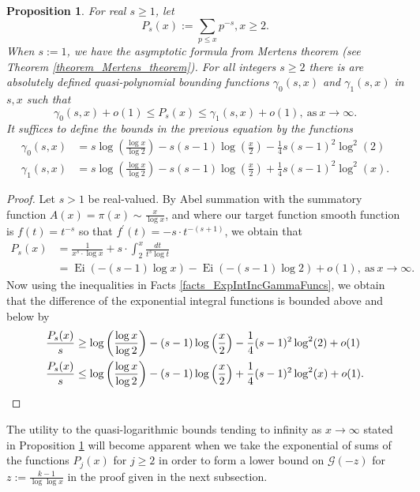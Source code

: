 \documentclass[11pt,reqno,a4letter]{article}
\numberwithin{figure}{section}
\numberwithin{table}{section}
\theoremstyle{plain}
\newtheorem{prop}[theorem]{Proposition}
\numberwithin{theorem}{section}
\theoremstyle{definition}
\newcommand{\NBRef}[1]{}
\begin{document}
\begin{prop} 
\label{cor_PartialSumsOfReciprocalsOfPrimePowers} 
For real $s \geq 1$, let 
\[
P_s(x) := \sum_{p \leq x} p^{-s}, x \geq 2. 
\]
When $s := 1$, we have the asymptotic formula from Mertens theorem 
(see Theorem \ref{theorem_Mertens_theorem}). 
For all integers $s \geq 2$ 
there is are absolutely defined quasi-polynomial bounding functions 
$\gamma_0(s, x)$ and $\gamma_1(s, x)$ in $s,x$ such that 
\[
\gamma_0(s, x) + o(1) \leq P_s(x) \leq \gamma_1(s, x) + o(1), \mathrm{\ as\ } x \rightarrow \infty. 
\] 
It suffices to define the bounds in the previous equation by the functions 
\begin{align*} 
\gamma_0(s, x) & = s\log\left(\frac{\log x}{\log 2}\right) - 
     s(s-1) \log\left(\frac{x}{2}\right) - 
     \frac{1}{4} s(s-1)^2 \log^2(2) \\ 
\gamma_1(s, x) & = s\log\left(\frac{\log x}{\log 2}\right) - s(s-1) \log\left(\frac{x}{2}\right) + 
     \frac{1}{4} s(s-1)^2 \log^2(x). 
\end{align*}
\end{prop} 
\NBRef{A05-2020-04-26} 
\begin{proof} 
Let $s > 1$ be real-valued. 
By Abel summation with the summatory function 
$A(x) = \pi(x) \sim \frac{x}{\log x}$, and where 
our target function smooth function is $f(t) = t^{-s}$ so that 
$f^{\prime}(t) = -s \cdot t^{-(s+1)}$, we obtain that 
\begin{align*} 
P_s(x) & = \frac{1}{x^s \cdot \log x} + s \cdot \int_2^{x} \frac{dt}{t^s \log t} \\ 
     & = \operatorname{Ei}(-(s-1) \log x) - \operatorname{Ei}(-(s-1) \log 2) + o(1), 
     \mathrm{\ as\ } x \rightarrow \infty. 
\end{align*} 
Now using the inequalities in Facts \ref{facts_ExpIntIncGammaFuncs}, we obtain that the 
difference of the exponential integral functions is bounded above and below by 
\begin{align*} 
\frac{P_s(x)}{s} & \geq \log\left(\frac{\log x}{\log 2}\right) - (s-1) \log\left(\frac{x}{2}\right) - 
     \frac{1}{4} (s-1)^2 \log^2(2) + o(1) \\ 
\frac{P_s(x)}{s} & \leq \log\left(\frac{\log x}{\log 2}\right) - (s-1) \log\left(\frac{x}{2}\right) + 
     \frac{1}{4} (s-1)^2 \log^2(x) + o(1). 
     \qedhere 
\end{align*} 
\end{proof} 

The utility to the quasi-logarithmic bounds tending to 
infinity as $x \rightarrow \infty$ stated in 
Proposition \ref{cor_PartialSumsOfReciprocalsOfPrimePowers} 
will become apparent when we take the exponential of sums of the 
functions $P_j(x)$ for $j \geq 2$ in order to form a lower bound on 
$\mathcal{G}(-z)$ for $z := \frac{k-1}{\log\log x}$ in the proof given in the 
next subsection. 
\end{document}
